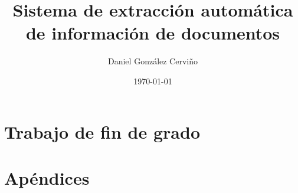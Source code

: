 \documentclass[11pt,a4paper]{report}
\title{Sistema de extracción automática de información de documentos}
\author{Daniel González Cerviño}
\date{\today}
\begin{document}
    
    

    \tableofcontents
    \listoffigures
    

    



    \part{Trabajo de fin de grado}\label{part:tfg}
    
    
    
    
    



    \part{Apéndices}\label{part:appendix}
    \appendix
    
    

    
    
\end{document}
